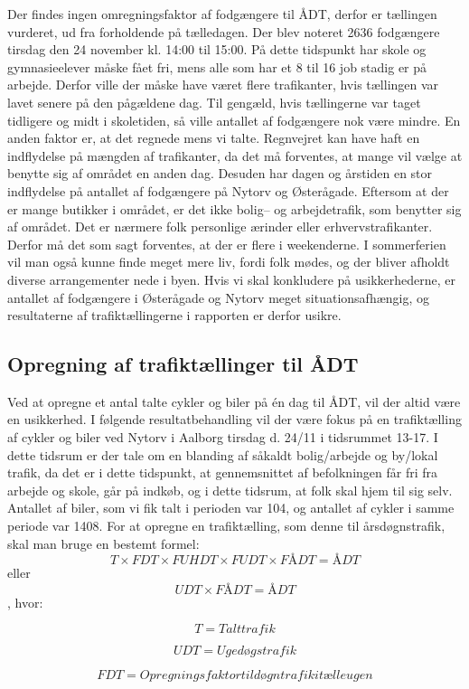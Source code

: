 Der findes ingen omregningsfaktor af fodgængere til ÅDT, derfor er tællingen vurderet, ud fra forholdende på tælledagen. Der blev noteret 2636 fodgængere tirsdag den 24 november kl. 14:00 til 15:00. På dette tidspunkt har skole og gymnasieelever måske fået fri, mens alle som har et 8 til 16 job stadig er på arbejde. Derfor ville der måske have været flere trafikanter, hvis tællingen var lavet senere på den pågældene dag. Til gengæld, hvis tællingerne var taget tidligere og midt i skoletiden, så ville antallet af fodgængere nok være mindre. En anden faktor er, at det regnede mens vi talte. Regnvejret kan have haft en indflydelse på mængden af trafikanter, da det må forventes, at mange vil vælge at benytte sig af området en anden dag. Desuden har dagen og årstiden en stor indflydelse på antallet af fodgængere på Nytorv og Østerågade. Eftersom at der er mange butikker i området, er det ikke bolig– og arbejdetrafik, som benytter sig af området. Det er nærmere folk personlige ærinder eller erhvervstrafikanter. Derfor må det som sagt forventes, at der er flere i weekenderne. I sommerferien vil man også kunne finde meget mere liv, fordi folk mødes, og der bliver afholdt diverse arrangementer nede i byen. Hvis vi skal konkludere på usikkerhederne, er antallet af fodgængere i Østerågade og Nytorv meget situationsafhængig, og resultaterne af trafiktællingerne i rapporten er derfor usikre.
\subsection{Opregning af trafiktællinger til ÅDT}
\label{sub:opregning}
Ved at opregne et antal talte cykler og biler på én dag til ÅDT, vil der altid være en usikkerhed.
I følgende resultatbehandling vil der være fokus på en trafiktælling af cykler og biler ved Nytorv i Aalborg tirsdag d. 24/11 i tidsrummet 13-17. I dette tidsrum er der tale om en blanding af såkaldt bolig/arbejde og by/lokal trafik, da det er i dette tidspunkt, at gennemsnittet af befolkningen får fri fra arbejde og skole, går på indkøb, og i dette tidsrum, at folk skal hjem til sig selv.
Antallet af biler, som vi fik talt i perioden var 104, og antallet af cykler i samme periode var 1408.
For at opregne en trafiktælling, som denne til årsdøgnstrafik, skal man bruge en bestemt formel:
$$ T \times FDT \times FUHDT \times FUDT \times FÅDT = ÅDT $$ eller $$ UDT \times FÅDT = ÅDT$$ , hvor:

$$T = Talt trafik$$

$$UDT = Ugedøgstrafik$$

$$FDT = Opregningsfaktor til døgntrafik i tælleugen$$

